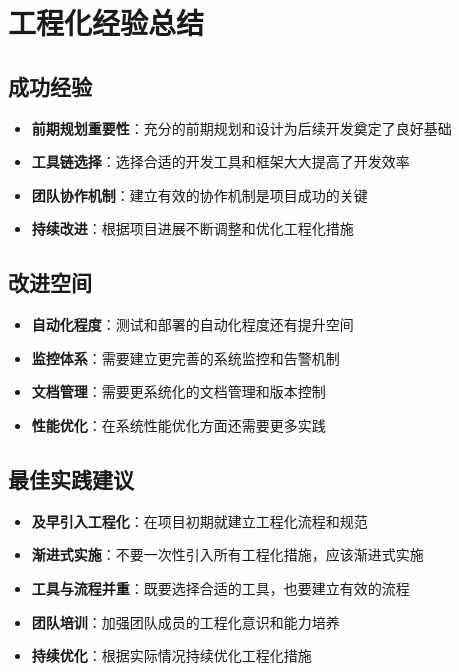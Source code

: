 \documentclass[a4paper]{article}
\begin{document}
\section{工程化经验总结}

\subsection{成功经验}

\begin{itemize}
    \item \textbf{前期规划重要性}：充分的前期规划和设计为后续开发奠定了良好基础
    \item \textbf{工具链选择}：选择合适的开发工具和框架大大提高了开发效率
    \item \textbf{团队协作机制}：建立有效的协作机制是项目成功的关键
    \item \textbf{持续改进}：根据项目进展不断调整和优化工程化措施
\end{itemize}

\subsection{改进空间}

\begin{itemize}
    \item \textbf{自动化程度}：测试和部署的自动化程度还有提升空间
    \item \textbf{监控体系}：需要建立更完善的系统监控和告警机制
    \item \textbf{文档管理}：需要更系统化的文档管理和版本控制
    \item \textbf{性能优化}：在系统性能优化方面还需要更多实践
\end{itemize}

\subsection{最佳实践建议}

\begin{itemize}
    \item \textbf{及早引入工程化}：在项目初期就建立工程化流程和规范
    \item \textbf{渐进式实施}：不要一次性引入所有工程化措施，应该渐进式实施
    \item \textbf{工具与流程并重}：既要选择合适的工具，也要建立有效的流程
    \item \textbf{团队培训}：加强团队成员的工程化意识和能力培养
    \item \textbf{持续优化}：根据实际情况持续优化工程化措施
\end{itemize}
\end{document}
